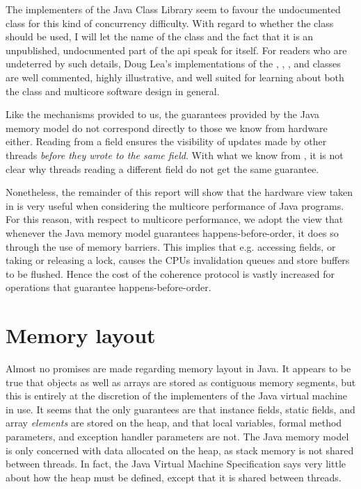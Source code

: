 The implementers of the Java Class Library seem to favour the undocumented
 class for this kind of concurrency difficulty. With
regard to whether the  class should be used, I will
let the name of the class and the fact that it is an unpublished, undocumented part
of the api speak for itself. For readers who are undeterred by such details,
Doug Lea's implementations of the  \cite{atomicintegersrc},
 \cite{atomicinterarraysrc},
 \cite{longaddersrc}, and  \cite{striped64src}
classes are well commented, highly illustrative, and well suited for learning
about both the  class and multicore software design in
general.

Like the mechanisms provided to us, the guarantees provided by the Java memory
model do not correspond directly to those we know from hardware either. Reading
from a  field ensures the visibility of updates made by other
threads \textit{before they wrote to the same field}. With what we know from
\cite{mckenny-barriers}, it is not clear why threads reading a different
 field do not get the same guarantee.

Nonetheless, the remainder of this report will show that the hardware view taken
in \cite{mckenny-barriers} is very useful when considering the multicore
performance of Java programs. For this reason, with respect to multicore performance, we adopt
the view that whenever the Java memory model guarantees happens-before-order, it
does so through the use of memory barriers. This implies that e.g. accessing
 fields, or taking or releasing a lock, causes the CPUs
invalidation queues and store buffers to be flushed. Hence the cost of the
coherence protocol is vastly increased for operations that guarantee
happens-before-order.

\section{Memory layout} Almost no promises are made regarding memory layout in
Java. It appears to be true that objects as well as arrays are stored as
contiguous memory segments,
but this is entirely at the discretion of the implementers of the Java virtual
machine in use. It seems that the only guarantees are that instance
fields, static fields, and array \textit{elements} are stored on the heap, and
that local variables, formal method parameters, and exception handler parameters
are not\cite[chapter~17]{javaspec}\cite[chapter~2]{jvmspec}. The Java memory
model is only concerned with data allocated on the heap, as stack memory is not
shared between threads. In fact, the Java Virtual Machine
Specification\cite{jvmspec} says very little about how the heap must be defined,
except that it is shared between threads.


